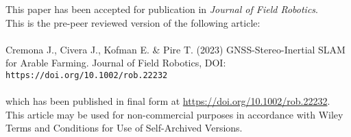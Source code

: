 \onecolumn
\begin{center}
This paper has been accepted for publication in \emph{Journal of Field Robotics}.\\
This is the pre-peer reviewed version of the following article:
\\~\\
Cremona J., Civera J., Kofman E. \& Pire T. (2023) GNSS-Stereo-Inertial SLAM for Arable Farming. Journal of Field Robotics, DOI: \nolinkurl{https://doi.org/10.1002/rob.22232} 
\\~\\
which has been published in final form at \url{https://doi.org/10.1002/rob.22232}. This article may be used for non-commercial purposes in accordance with Wiley Terms and Conditions for Use of Self-Archived Versions.

\end{center}